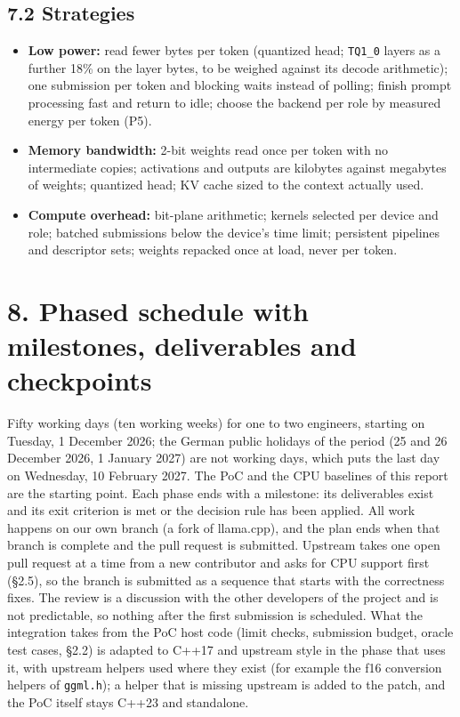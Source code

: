 \documentclass[
  10pt,
]{article}
\providecommand{\tightlist}{%
  \setlength{\itemsep}{0pt}\setlength{\parskip}{0pt}}
\begin{document}
\subsection{7.2 Strategies}\label{strategies}

\begin{itemize}
\tightlist%
\item
  \textbf{Low power:} read fewer bytes per token (quantized head;
  \texttt{TQ1\_0} layers as a further 18\% on the layer bytes, to be
  weighed against its decode arithmetic); one submission per token and
  blocking waits instead of polling; finish prompt processing fast and
  return to idle; choose the backend per role by measured energy per
  token (P5).
\item
  \textbf{Memory bandwidth:} 2-bit weights read once per token with no
  intermediate copies; activations and outputs are kilobytes against
  megabytes of weights; quantized head; KV cache sized to the context
  actually used.
\item
  \textbf{Compute overhead:} bit-plane arithmetic; kernels selected per
  device and role; batched submissions below the device's time limit;
  persistent pipelines and descriptor sets; weights repacked once at
  load, never per token.
\end{itemize}

\section{8. Phased schedule with milestones, deliverables and
checkpoints}\label{phased-schedule-with-milestones-deliverables-and-checkpoints}

Fifty working days (ten working weeks) for one to two
engineers, starting on Tuesday, 1 December 2026; the German public
holidays of the period (25 and 26 December 2026, 1 January 2027) are
not working days, which puts the last day on Wednesday, 10 February
2027. The PoC and the
CPU baselines of this report are the starting point. Each phase ends
with a milestone: its deliverables exist and its exit criterion is met
or the decision rule has been applied. All work happens on our own
branch (a fork of llama.cpp), and the plan ends when that branch is
complete and the pull request is submitted. Upstream takes one open pull
request at a time from a new contributor and asks for CPU support first
(\S{}2.5), so the branch is submitted as a sequence that starts with the
correctness fixes. The review is a discussion with the other developers
of the project and is not predictable, so nothing after the first
submission is scheduled. What the integration takes from the PoC host
code (limit checks, submission budget, oracle test cases, \S{}2.2) is
adapted to C++17 and upstream style in the phase that uses it, with
upstream helpers used where they exist (for example the f16 conversion
helpers of \texttt{ggml.h}); a helper that is missing upstream is added
to the patch, and the PoC itself stays C++23 and standalone.
\end{document}
